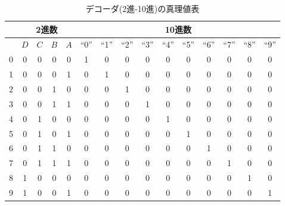 \documentclass[12pt]{jarticle}
\begin{document}
\begin{itemize}
          \begin{table}[h]
              \caption{デコーダ(2進-10進)の真理値表}
              \begin{center}
                  \begin{tabular}{|c|c|c|c|c|c|c|c|c|c|c|c|c|c|c|}
                      \hline
                        & \multicolumn{4}{|c|}{2進数} & \multicolumn{10}{|c|}{10進数}                                                                                             \\ \hline
                        & $D$                         & $C$                           & $B$ & $A$ & ``0'' & ``1'' & ``2'' & ``3'' & ``4'' & ``5'' & ``6'' & ``7'' & ``8'' & ``9'' \\
                      \hline
                      0 & 0                           & 0                             & 0   & 0   & 1     & 0     & 0     & 0     & 0     & 0     & 0     & 0     & 0     & 0     \\ \hline
                      1 & 0                           & 0                             & 0   & 1   & 0     & 1     & 0     & 0     & 0     & 0     & 0     & 0     & 0     & 0     \\ \hline
                      2 & 0                           & 0                             & 1   & 0   & 0     & 0     & 1     & 0     & 0     & 0     & 0     & 0     & 0     & 0     \\ \hline
                      3 & 0                           & 0                             & 1   & 1   & 0     & 0     & 0     & 1     & 0     & 0     & 0     & 0     & 0     & 0     \\ \hline
                      4 & 0                           & 1                             & 0   & 0   & 0     & 0     & 0     & 0     & 1     & 0     & 0     & 0     & 0     & 0     \\ \hline
                      5 & 0                           & 1                             & 0   & 1   & 0     & 0     & 0     & 0     & 0     & 1     & 0     & 0     & 0     & 0     \\ \hline
                      6 & 0                           & 1                             & 1   & 0   & 0     & 0     & 0     & 0     & 0     & 0     & 1     & 0     & 0     & 0     \\ \hline
                      7 & 0                           & 1                             & 1   & 1   & 0     & 0     & 0     & 0     & 0     & 0     & 0     & 1     & 0     & 0     \\ \hline
                      8 & 1                           & 0                             & 0   & 0   & 0     & 0     & 0     & 0     & 0     & 0     & 0     & 0     & 1     & 0     \\ \hline
                      9 & 1                           & 0                             & 0   & 1   & 0     & 0     & 0     & 0     & 0     & 0     & 0     & 0     & 0     & 1     \\ \hline
                  \end{tabular}
              \end{center}
              \label{table11}
          \end{table}


\end{itemize}
\end{document}
